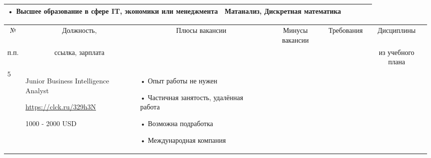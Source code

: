 \documentclass[14pt]{extreport}
\begin{document}
\begin{landscape}
\begin{table}[H]
\begin{center}
\begin{small}
\begin{tabular}{|p{0.1cm}|p{5cm}|p{4.5cm}|p{4.5cm}|p{4cm}|p{3cm}|}
				• Высшее образование в сфере IT, экономики или менеджмента
				&
				Матанализ, Дискретная математика
				\\
			    \hline
			\end{tabular}
		\end{small}
	\end{center}
\end{table}
\begin{table}[H]
	\begin{center}
		\begin{small}
		\begin{tabular}{|p{0.1cm}|p{5cm}|p{4.5cm}|p{4.5cm}|p{4cm}|p{3cm}|} \hline
			\multicolumn{1}{|c|}{№}&\multicolumn{1}{c|}{Должность,}&\multicolumn{1}{c|}{Плюсы вакансии}&\multicolumn{1}{c|}{Минусы вакансии}&\multicolumn{1}{c|}{Требования}&\multicolumn{1}{c|}{Дисциплины}\\ 
			\multicolumn{1}{|c|}{п.п.}&\multicolumn{1}{c|}{ссылка, зарплата}&\multicolumn{1}{c|}{}&\multicolumn{1}{c|}{}&\multicolumn{1}{c|}{}&\multicolumn{1}{c|}{из учебного плана}\\ 
			\hline
			5 & Junior Business Intelligence Analyst
			
			\url{https://clck.ru/329h3N}
			
			1000 - 2000 USD
			&
			• Опыт работы не нужен
			
			• Частичная занятость, удалённая работа
			
			• Возможна подработка
			
			• Международная компания
			

\end{tabular}
\end{small}
\end{center}
\end{table}
\end{landscape}
\end{document}
